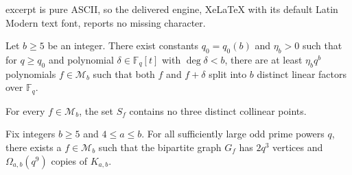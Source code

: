 \documentclass[10pt,a4paper]{amsart}
\newcommand{\F}{\mathbb{F}}
\begin{document}
excerpt is pure ASCII, so the delivered engine, XeLaTeX with its default Latin Modern text font, reports no missing character.
\begin{lemma} \label{lem:double-shift}
Let $b \geq 5$ be an integer. There exist constants $q_0=q_0(b)$ and $\eta_b > 0$ such 
that for $q \geq q_0$ and polynomial 
$\delta \in \F_q[t]$ with $\deg \delta < b$, there are at least $\eta_b q^b$ polynomials 
$f \in \mathcal{M}_b$ such that both $f$ and $f + \delta$ split into $b$ 
distinct linear factors over $\F_q$.
\end{lemma}

\begin{lemma} \label{lem:no-three-collinear}
For every $f \in \mathcal{M}_b$, the set $S_f$ contains no three distinct collinear points.
\end{lemma}

\begin{lemma} \label{lem:good-plane-count}
Fix integers $b \geq 5$ and $4 \leq a \leq b$. For all sufficiently large odd prime powers $q$, there exists a $f \in \mathcal{M}_b$ such that  the bipartite graph $G_f$ has $2q^3$ vertices and $\Omega_{a,b}(q^9)$ copies of $K_{a,b}$.
\end{lemma}
\end{document}
